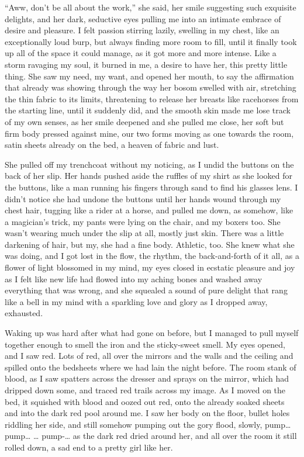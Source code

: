 ``Aww, don't be all about the work,'' she said, her smile suggesting
such exquisite delights, and her dark, seductive eyes pulling me
into an intimate embrace of desire and pleasure. I felt passion
stirring lazily, swelling in my chest, like an exceptionally loud
burp, but always finding more room to fill, until it finally took
up all of the space it could manage, as it got more and more
intense. Like a storm ravaging my soul, it burned in me, a desire
to have her, this pretty little thing. She saw my need, my want,
and opened her mouth, to say the affirmation that already was
showing through the way her bosom swelled with air, stretching the
thin fabric to its limits, threatening to release her breasts like
racehorses from the starting line, until it suddenly did, and the
smooth skin made me lose track of my own senses, as her smile
deepened and she pulled me close, her soft but firm body pressed
against mine, our two forms moving as one towards the room, satin
sheets already on the bed, a heaven of fabric and lust.

She pulled off my trenchcoat without my noticing, as I undid the
buttons on the back of her slip. Her hands pushed aside the ruffles
of my shirt as she looked for the buttons, like a man running his
fingers through sand to find his glasses lens. I didn't notice she
had undone the buttons until her hands wound through my chest hair,
tugging like a rider at a horse, and pulled me down, as somehow,
like a magician's trick, my pants were lying on the chair, and my
boxers too. She wasn't wearing much under the slip at all, mostly
just skin. There was a little darkening of hair, but my, she had a
fine body. Athletic, too. She knew what she was doing, and I got
lost in the flow, the rhythm, the back-and-forth of it all, as a
flower of light blossomed in my mind, my eyes closed in ecstatic
pleasure and joy as I felt like new life had flowed into my aching
bones and washed away everything that was wrong, and she squealed a
sound of pure delight that rang like a bell in my mind with a
sparkling love and glory as I dropped away, exhausted.

Waking up was hard after what had gone on before, but I managed to
pull myself together enough to smell the iron and the sticky-sweet
smell. My eyes opened, and I saw red. Lots of red, all over the
mirrors and the walls and the ceiling and spilled onto the
bedsheets where we had lain the night before. The room stank of
blood, as I saw spatters across the dresser and sprays on the
mirror, which had dripped down some, and traced red trails across
my image. As I moved on the bed, it squished with blood and oozed
out red, onto the already soaked sheets and into the dark red pool
around me. I saw her body on the floor, bullet holes riddling her
side, and still somehow pumping out the gory flood, slowly, pump{\ldots}
pump{\ldots} {\ldots} pump-{\ldots} as the dark red dried around her, and all over
the room it still rolled down, a sad end to a pretty girl like
her.

